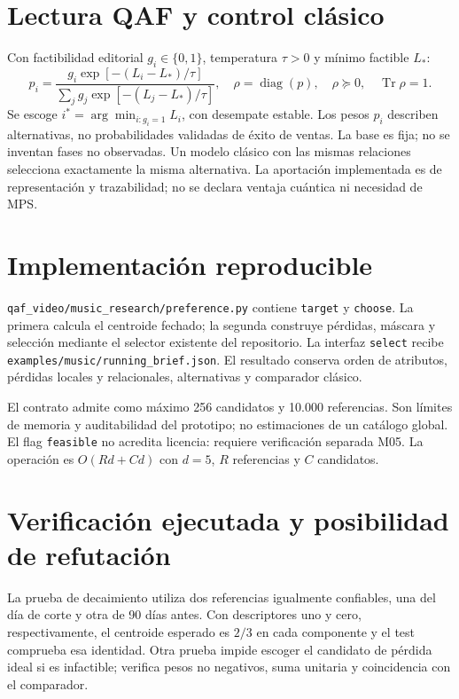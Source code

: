 \documentclass[11pt,a4paper]{article}
\begin{document}
\section{Lectura QAF y control clásico}
Con factibilidad editorial $g_i\in\{0,1\}$, temperatura $\tau>0$ y mínimo factible $L_*$:
\begin{equation}
 p_i=\frac{g_i\exp[-(L_i-L_*)/\tau]}{\sum_jg_j\exp[-(L_j-L_*)/\tau]},\quad
 \rho=\operatorname{diag}(p),\quad\rho\succeq0,\quad\operatorname{Tr}\rho=1.
\end{equation}
Se escoge $i^*=\arg\min_{i:g_i=1}L_i$, con desempate estable. Los pesos $p_i$ describen alternativas, no probabilidades validadas de éxito de ventas. La base es fija; no se inventan fases no observadas. Un modelo clásico con las mismas relaciones selecciona exactamente la misma alternativa. La aportación implementada es de representación y trazabilidad; no se declara ventaja cuántica ni necesidad de MPS.

\newpage
\section{Implementación reproducible}
\texttt{qaf\_video/music\_research/preference.py} contiene \texttt{target} y \texttt{choose}. La primera calcula el centroide fechado; la segunda construye pérdidas, máscara y selección mediante el selector existente del repositorio. La interfaz \texttt{select} recibe \texttt{examples/music/running\_brief.json}. El resultado conserva orden de atributos, pérdidas locales y relacionales, alternativas y comparador clásico.

El contrato admite como máximo 256 candidatos y 10.000 referencias. Son límites de memoria y auditabilidad del prototipo; no estimaciones de un catálogo global. El flag \texttt{feasible} no acredita licencia: requiere verificación separada M05. La operación es $O(Rd+Cd)$ con $d=5$, $R$ referencias y $C$ candidatos.
\section{Verificación ejecutada y posibilidad de refutación}
La prueba de decaimiento utiliza dos referencias igualmente confiables, una del día de corte y otra de 90 días antes. Con descriptores uno y cero, respectivamente, el centroide esperado es $2/3$ en cada componente y el test comprueba esa identidad. Otra prueba impide escoger el candidato de pérdida ideal si es infactible; verifica pesos no negativos, suma unitaria y coincidencia con el comparador.
\end{document}
